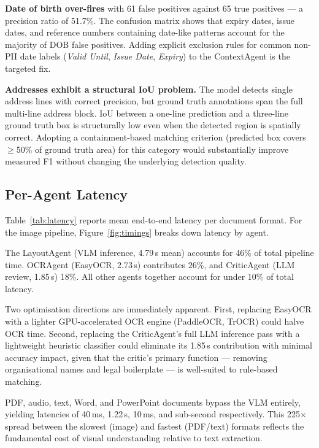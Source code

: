 \textbf{Date of birth over-fires} with 61 false
positives against 65 true positives ---
a precision ratio of 51.7\%.
The confusion matrix shows that expiry dates,
issue dates, and reference numbers containing
date-like patterns account for the majority of DOB
false positives.
Adding explicit exclusion rules for common
non-PII date labels (\textit{Valid Until},
\textit{Issue Date}, \textit{Expiry}) to the
ContextAgent is the targeted fix.

\textbf{Addresses exhibit a structural IoU problem.}
The model detects single address lines with correct
precision, but ground truth annotations span the
full multi-line address block.
IoU between a one-line prediction and a three-line
ground truth box is structurally low even when the
detected region is spatially correct.
Adopting a containment-based matching criterion
(predicted box covers $\geq$50\% of ground truth
area) for this category would substantially improve
measured F1 without changing the underlying
detection quality.

\subsection{Per-Agent Latency}



Table~\ref{tab:latency} reports mean end-to-end
latency per document format.
For the image pipeline, Figure~\ref{fig:timings}
breaks down latency by agent.

The LayoutAgent (VLM inference, 4.79\,s mean)
accounts for 46\% of total pipeline time.
OCRAgent (EasyOCR, 2.73\,s) contributes 26\%,
and CriticAgent (LLM review, 1.85\,s) 18\%.
All other agents together account for under 10\%
of total latency.

Two optimisation directions are immediately apparent.
First, replacing EasyOCR with a lighter
GPU-accelerated OCR engine (PaddleOCR, TrOCR) could
halve OCR time.
Second, replacing the CriticAgent's full LLM
inference pass with a lightweight heuristic
classifier could eliminate its 1.85\,s contribution
with minimal accuracy impact, given that the critic's
primary function --- removing organisational names
and legal boilerplate --- is well-suited to
rule-based matching.

PDF, audio, text, Word, and PowerPoint documents
bypass the VLM entirely, yielding latencies of
40\,ms, 1.22\,s, 10\,ms, and sub-second
respectively.
This 225$\times$ spread between the slowest
(image) and fastest (PDF/text) formats reflects
the fundamental cost of visual understanding relative
to text extraction.

